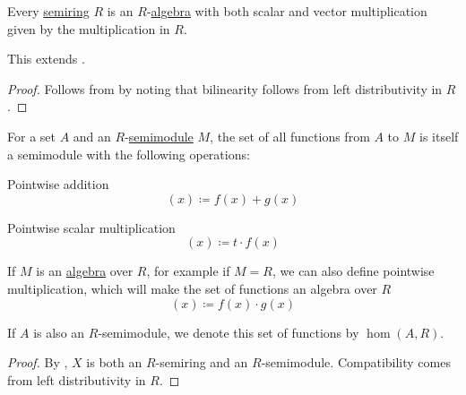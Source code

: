 \begin{proposition}\label{thm:semiring_is_algebra}
  Every \hyperref[def:semiring]{semiring} \( R \) is an \( R \)-\hyperref[def:algebra_over_semiring]{algebra} with both scalar and vector multiplication given by the multiplication in \( R \).

  This extends .
\end{proposition}
\begin{proof}
  Follows from  by noting that bilinearity follows from left distributivity in \( R \).
\end{proof}

\begin{proposition}\label{thm:functions_over_semimodule}
  For a set \( A \) and an \( R \)-\hyperref[def:semimodule]{semimodule} \( M \), the set of all functions from \( A \) to \( M \) is itself a semimodule with the following operations:
  \begin{thmenum}
     Pointwise addition
    \begin{equation*}
      [f + g](x) \coloneqq f(x) + g(x)
    \end{equation*}

     Pointwise scalar multiplication
    \begin{equation*}
      [t \cdot f](x) \coloneqq t \cdot f(x)
    \end{equation*}

     If \( M \) is an \hyperref[def:algebra_over_semiring]{algebra} over \( R \), for example if \( M = R \), we can also define pointwise multiplication, which will make the set of functions an algebra over \( R \)
    \begin{equation*}
      [f \cdot g](x) \coloneqq f(x) \cdot g(x)
    \end{equation*}
  \end{thmenum}

  If \( A \) is also an \( R \)-semimodule, we denote this set of functions by \( \hom(A, R) \).
\end{proposition}
\begin{proof}
  By , \( X \) is both an \( R \)-semiring and an \( R \)-semimodule. Compatibility comes from left distributivity in \( R \).
\end{proof}

